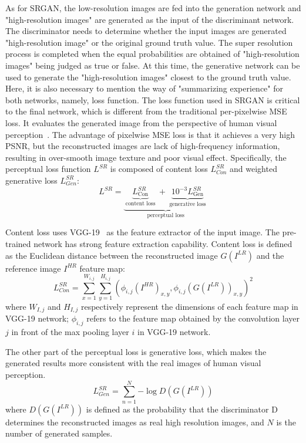 \documentclass[10pt,twocolumn,letterpaper]{article}
\begin{document}
As for SRGAN, the low-resolution images are fed into the generation network and "high-resolution images" are generated as the input of the discriminant network. The discriminator needs to determine whether the input images are  generated "high-resolution image" or the original ground truth value. The super resolution process is completed when the equal probabilities are obtained of "high-resolution images" being  judged as true or false.  At this time, the generative network can be used to generate the "high-resolution images" closest to the ground truth value. Here, it is also necessary to mention the way of "summarizing experience" for both networks, namely, loss function. The loss function used in SRGAN is critical to the final network, which is different from the traditional per-pixelwise MSE loss. It evaluates the generated image from the perspective of human visual perception~\cite{ledig2017photo}. The advantage of pixelwise MSE loss is that it achieves a very high PSNR, but the reconstructed images are lack of high-frequency information, resulting in over-smooth image texture and poor visual effect. Specifically, the perceptual loss function $L^{SR}$ is composed of content loss $L_{Con}^{SR}$ and weighted generative loss $L_{Gen}^{SR}$:
\begin{equation}\label{eq1}
{L^{SR}} = \underbrace {\underbrace {L_{\text{Con}}^{SR}}_{{\text{ content loss }}} + \underbrace {{{10}^{ - 3}}L_{{\text{Gen}}}^{SR}}_{{\text{ generative loss }}}}_{{\text{perceptual loss}}}
\end{equation}

Content loss uses VGG-19~\cite{simonyan2014very} as the feature extractor of the input image. The pre-trained network has strong feature extraction capability. Content loss is defined as the Euclidean distance between the reconstructed image $G{\left(I^{L R}\right)}$ and the reference image $I^{HR}$ feature map:
\begin{equation}\label{eq２}
L_{Con}^{SR} = \sum\limits_{x = 1}^{{W_{i,j}}} {\sum\limits_{y = 1}^{{H_{i,j}}} {{{\left( {{\phi _{i,j}}{{\left( {{I^{HR}}} \right)}_{x,y}},{\phi _{i,j}}{{\left( {G\left( {{I^{LR}}} \right)} \right)}_{x,y}}} \right)}^2}} } 
\end{equation}
where $W_{I,j}$ and $H_{I,j}$ respectively represent the dimensions of each feature map in VGG-19 network; ${\phi _{i,j}}$ refers to the feature map \cite{ledig2017photo} obtained by the convolution layer $j$ in front of the max pooling layer $i$ in VGG-19 network.

The other part of the perceptual loss is generative loss, which makes the generated results more consistent with the real images of human visual perception.
\begin{equation}\label{eq3}
L_{Gen}^{SR} = \sum\limits_{n = 1}^N { - \log D\left( {G\left( {{I^{LR}}} \right)} \right)} 
\end{equation}
where $D{\left(G\left(I^{L R}\right)\right)}$ is defined as the probability that the discriminator D determines the reconstructed images as real high resolution images, and $N$ is the number of generated samples.
\end{document}
